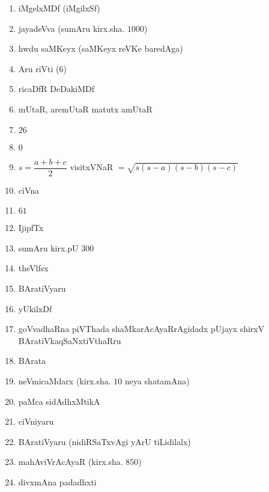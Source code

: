 \begin{enumerate}
\item iMgelxMDf (iMgilxSf)

\item jayadeVva (sumAru kirx.sha. $1000$)

\item hwdu saMKeyx (saMKeyx reVKe baredAga)

\item Aru riVti ($6$)

\item ricaDfR DeDakiMDf

\item mUtaR, aremUtaR matutx amUtaR 

\item $26$

\item $0$

\item $s= \dfrac{a+b+c}{2}$ \quad visitxVNaR $=\sqrt{s(s-a)(s-b)(s-c)}$

\item ciVna

\item $61$

\item IjipfTx

\item sumAru kirx.pU $300$

\item theVlfsx

\item BAratiVyaru

\item yUkilxDf

\item goVvadhaRna piVThada shaMkarAcAyaRrAgidadx pUjayx shirxV BAratiVkaqSaNxtiVthaRru

\item BArata

\item neVmicaMdarx (kirx.sha. $10$ neya shatamAna)

\item paMca sidAdhxMtikA

\item ciVniyaru

\item BAratiVyaru (nidiRSaTxvAgi yArU tiLidilalx)

\item mahAviVrAcAyaR (kirx.sha. $850$)

\item divxmAna padadhxti


\end{enumerate}
